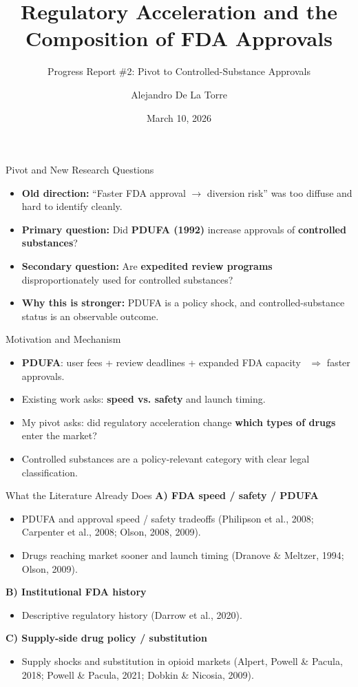 \documentclass[11pt]{beamer}
\title{Regulatory Acceleration and the Composition of FDA Approvals}
\subtitle{Progress Report \#2: Pivot to Controlled-Substance Approvals}
\author{Alejandro De La Torre}
\institute{ECON 580}
\date{March 10, 2026}
\begin{document}
\begin{frame}
  \titlepage
\end{frame}

\begin{frame}{Pivot and New Research Questions}
\begin{itemize}
  \item \textbf{Old direction:} ``Faster FDA approval $\rightarrow$ diversion risk'' was too diffuse and hard to identify cleanly.
  \item \textbf{Primary question:} Did \textbf{PDUFA (1992)} increase approvals of \textbf{controlled substances}?
  \item \textbf{Secondary question:} Are \textbf{expedited review programs} disproportionately used for controlled substances?
  \item \textbf{Why this is stronger:} PDUFA is a policy shock, and controlled-substance status is an observable outcome.
\end{itemize}
\end{frame}

\begin{frame}{Motivation and Mechanism}
\begin{itemize}
  \item \textbf{PDUFA}: user fees + review deadlines + expanded FDA capacity \ $\Rightarrow$ faster approvals.
  \item Existing work asks: \textbf{speed vs. safety} and launch timing.
  \item My pivot asks: did regulatory acceleration change \textbf{which types of drugs} enter the market?
  \item Controlled substances are a policy-relevant category with clear legal classification.
\end{itemize}
\end{frame}

\begin{frame}{What the Literature Already Does}
\textbf{A) FDA speed / safety / PDUFA}
\begin{itemize}
  \item PDUFA and approval speed / safety tradeoffs (Philipson et al., 2008; Carpenter et al., 2008; Olson, 2008, 2009).
  \item Drugs reaching market sooner and launch timing (Dranove \& Meltzer, 1994; Olson, 2009).
\end{itemize}

\vspace{0.5em}
\textbf{B) Institutional FDA history}
\begin{itemize}
  \item Descriptive regulatory history (Darrow et al., 2020).
\end{itemize}

\vspace{0.5em}
\textbf{C) Supply-side drug policy / substitution}
\begin{itemize}
  \item Supply shocks and substitution in opioid markets (Alpert, Powell \& Pacula, 2018; Powell \& Pacula, 2021; Dobkin \& Nicosia, 2009).
\end{itemize}
\end{frame}
\end{document}
